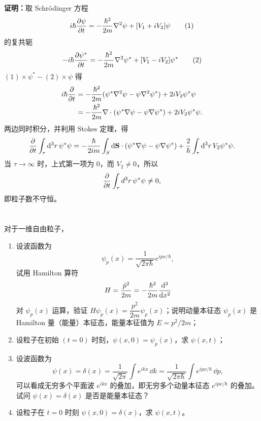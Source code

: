 \documentclass[12pt,a4paper]{article}
\begin{document}
\vspace{0.5cm}

\noindent\textbf{证明：}取 Schr\"odinger 方程
\[
 i\hbar \pdv{\psi}{t} = -\frac{\hbar^2}{2m}\nabla^2\psi + [V_1+iV_2]\psi \tag{1}
\]
的复共轭
\[
 -i\hbar \pdv{\psi^*}{t} = -\frac{\hbar^2}{2m}\nabla^2\psi^* + [V_1-iV_2]\psi^* \tag{2}
\]
$(1)\times \psi^* - (2)\times \psi$ 得
\begin{align*}
   i\hbar \pdv{}{t}(\psi^*\psi)
   &= -\frac{\hbar^2}{2m}(\psi^*\nabla^2\psi - \psi\nabla^2\psi^*) + 2iV_2\psi^*\psi\\
   &= -\frac{\hbar^2}{2m}\nabla\cdot(\psi^*\nabla\psi - \psi\nabla\psi^*) + 2iV_2\psi^*\psi.
\end{align*}
两边同时积分，并利用 Stokes 定理，得
\[
 \pdv{}{t}\int_\tau \dd^3r\, \psi^*\psi
 = -\frac{\hbar}{2im}\int_S \dd\vb{S}\cdot(\psi^*\nabla\psi - \psi\nabla\psi^*)
 + \frac{2}{\hbar}\int_\tau \dd^3r\, V_2\psi^*\psi.
\]
当 $\tau\to\infty$ 时，上式第一项为 $0$，而 $V_2\neq 0$，所以
\[
 \pdv{}{t}\int_\tau d^3r\, \psi^*\psi \neq 0,
\]
即粒子数不守恒。

\section{}
对于一维自由粒子，

\begin{enumerate}[label=(\alph*)]
    \item 设波函数为
    \[
    \psi_p(x)=\frac{1}{\sqrt{2\pi\hbar}}e^{ipx/\hbar},
    \]
    试用 Hamilton 算符
    \[
    H = \frac{\hat p^2}{2m} = -\frac{\hbar^2}{2m}\dv[2]{}{x}
    \]
    对 $\psi_p(x)$ 运算，验证 $H\psi_p(x)=\dfrac{p^2}{2m}\psi_p(x)$；说明动量本征态 $\psi_p(x)$ 是 Hamilton 量（能量）本征态，能量本征值为 $E=p^2/2m$；

    \item 设粒子在初始 $(t=0)$ 时刻，$\psi(x,0)=\psi_{p}(x)$，求 $\psi(x,t)$；

    \item 设波函数为
    \[
    \psi(x)=\delta(x)=\frac{1}{\sqrt{2\pi}}\int e^{ikx}\, \dd k
    = \frac{1}{\sqrt{2\pi\hbar}}\int e^{ipx/\hbar}\, \dd p,
    \]
    可以看成无穷多个平面波 $e^{ikx}$ 的叠加，即无穷多个动量本征态 $e^{ipx/\hbar}$ 的叠加。试问 $\psi(x)=\delta(x)$ 是否是能量本征态？

    \item 设粒子在 $t=0$ 时刻 $\psi(x,0)=\delta(x)$，求 $\psi(x,t)$。
\end{enumerate}

\vspace{0.5cm}
\end{document}
